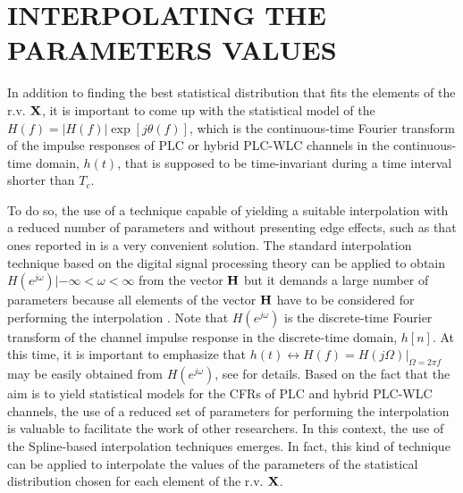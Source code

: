 \section{INTERPOLATING THE PARAMETERS VALUES} \label{sec:P2}

In addition to finding the best statistical distribution that fits the elements of the \ac{r.v.} $\bf X$, it is important to come up with the statistical model of the $H(f)=|H(f)|\exp[j\theta(f) ]$, which is the continuous-time Fourier transform of the impulse responses of \ac{PLC} or hybrid \ac{PLC}-\ac{WLC} channels in the continuous-time domain, $h(t)$, that is supposed to be time-invariant during a time interval shorter than $T_c$.  

To do so, the use of a technique capable of yielding a suitable interpolation with a reduced number of parameters and without presenting edge effects, such as that ones reported in \cite{Luis:AI} is a very convenient solution. The standard interpolation technique based on the digital signal processing theory can be applied to obtain $H(e^{j\omega})|-\infty <\omega < \infty$ from the vector $\bf H$ but it demands a large number of parameters  because all elements of the vector $\bf H$ have to be considered for performing the interpolation \cite{mitra}. Note that $H(e^{j\omega})$  is the discrete-time Fourier transform of the channel impulse response in the discrete-time domain, $h[n]$. At this time, it is important to emphasize that $h(t) \leftrightarrow H(f)=H(j\Omega)|_{\Omega = 2\pi f}$ may be easily obtained from $H(e^{j\omega})$, see \cite{mitra} for details. Based on the fact that the aim is to yield statistical models for the \acp{CFR} of \ac{PLC} and hybrid \ac{PLC}-\ac{WLC} channels, the use of a reduced set of parameters for performing the interpolation is valuable to facilitate the work of other researchers. In this context, the use of the Spline-based interpolation techniques emerges. In fact, this kind of technique can be applied to interpolate the values of the parameters of the statistical distribution chosen for each element of the \ac{r.v.} ${\bf X}$.

